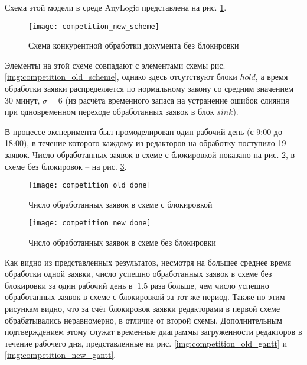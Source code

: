 \vspace{\baselineskip}
Схема этой модели в среде AnyLogic представлена на рис. \ref{img:competition_new_scheme}.

\begin{figure}[h!]
  \centering
  \texttt{[image: competition\_new\_scheme]}
  \caption{Схема конкурентной обработки документа без блокировки}
  \label{img:competition_new_scheme}
\end{figure}

\vspace{\baselineskip}
Элементы на этой схеме совпадают с элементами схемы рис. \ref{img:competition_old_scheme}, однако здесь отсутствуют блоки $hold$, а время обработки заявки распределяется по нормальному закону со средним значением 30 минут, $\sigma=6$ (из расчёта временного запаса на устранение ошибок слияния при одновременном переходе обработанных заявок в блок $sink$).

\vspace{\baselineskip}
В процессе эксперимента был промоделирован один рабочий день (с 9:00 до 18:00), в течение которого каждому из редакторов на обработку поступило 19 заявок. Число обработанных заявок в схеме с блокировкой показано на рис. \ref{img:competition_old_done}, в схеме без блокировок -- на рис. \ref{img:competition_new_done}.

\begin{figure}[h!]
  \centering
  \texttt{[image: competition\_old\_done]}
  \caption{Число обработанных заявок в схеме с блокировкой}
  \label{img:competition_old_done}
\end{figure}

\begin{figure}[h!]
  \centering
  \texttt{[image: competition\_new\_done]}
  \caption{Число обработанных заявок в схеме без блокировки}
  \label{img:competition_new_done}
\end{figure}

\vspace{\baselineskip}
Как видно из представленных результатов, несмотря на б\textit{о}льшее среднее время обработки одной заявки, число успешно обработанных заявок в схеме без блокировки за один рабочий день в $~1.5$ раза больше, чем число успешно обработанных заявок в схеме с блокировкой за тот же период. Также по этим рисункам видно, что за счёт блокировок заявки редакторами в первой схеме обрабатывались неравномерно, в отличие от второй схемы. Дополнительным подтверждением этому служат временные диаграммы загруженности редакторов в течение рабочего дня, представленные на рис. \ref{img:competition_old_gantt} и \ref{img:competition_new_gantt}.

